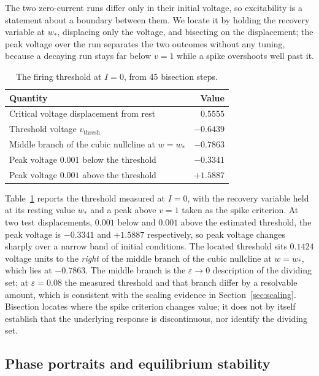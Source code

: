 \documentclass[11pt,a4paper]{article}
\begin{document}
The two zero-current runs differ only in their initial voltage, so excitability is a statement about a boundary between them. We locate it by holding the recovery variable at $w_*$, displacing only the voltage, and bisecting on the displacement; the peak voltage over the run separates the two outcomes without any tuning, because a decaying run stays far below $v=1$ while a spike overshoots well past it.

\begin{table}[H]
  \centering
  \caption{The firing threshold at $I=0$, from 45 bisection steps.}
  \label{tab:threshold}
  \small
  \begin{tabular}{@{}lr@{}}
    \toprule
    Quantity & Value\\
    \midrule
    Critical voltage displacement from rest & $0.5555$\\
    Threshold voltage $v_{\mathrm{thresh}}$ & $-0.6439$\\
    Middle branch of the cubic nullcline at $w=w_*$ & $-0.7863$\\
    Peak voltage $0.001$ below the threshold & $-0.3341$\\
    Peak voltage $0.001$ above the threshold & $+1.5887$\\
    \bottomrule
  \end{tabular}
\end{table}

Table~\ref{tab:threshold} reports the threshold measured at $I=0$, with the recovery variable held at its resting value $w_*$ and a peak above $v=1$ taken as the spike criterion. At two test displacements, $0.001$ below and $0.001$ above the estimated threshold, the peak voltage is $-0.3341$ and $+1.5887$ respectively, so peak voltage changes sharply over a narrow band of initial conditions. The located threshold sits $0.1424$ voltage units to the \emph{right} of the middle branch of the cubic nullcline at $w=w_*$, which lies at $-0.7863$. The middle branch is the $\varepsilon\to0$ description of the dividing set; at $\varepsilon=0.08$ the measured threshold and that branch differ by a resolvable amount, which is consistent with the scaling evidence in Section~\ref{sec:scaling}. Bisection locates where the spike criterion changes value; it does not by itself establish that the underlying response is discontinuous, nor identify the dividing set.


\clearpage

\subsection{Phase portraits and equilibrium stability}
\end{document}
